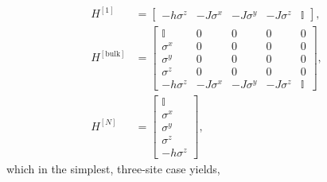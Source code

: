  \begin{align}
 	H^{[1]} &= \begin{bmatrix} -h\sigma^{z} & -J\sigma^{x} & -J\sigma^{y} & -J\sigma^{z} & \mathbb{I} \end{bmatrix}, \label{eq:mpo1-2} \\
 	H^{[\mathrm{bulk}]} &= \begin{bmatrix} \mathbb{I} & 0 & 0 & 0 & 0 \\
 										   \sigma^{x} & 0 & 0 & 0 & 0 \\
 										   \sigma^{y} & 0 & 0 & 0 & 0 \\
 										   \sigma^{z} & 0 & 0 & 0 & 0 \\
 										    -h\sigma^{z} & -J\sigma^{x} & -J\sigma^{y} & -J\sigma^{z} & \mathbb{I}
 							\end{bmatrix}, \label{eq:mpo1-3} \\
 	H^{[N]} &= \begin{bmatrix} \mathbb{I} \\ \sigma^{x} \\ \sigma^{y} \\ \sigma^{z} \\ -h\sigma^{z} \end{bmatrix}, \label{eq:mpo1-4}
 \end{align}
 which in the simplest, three-site case yields,
